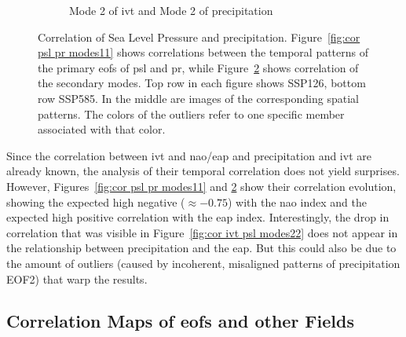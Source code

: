 \begin{figure}[!htbp]
\begin{subfigure}[b]{0.95\textwidth}
    \caption{Mode 2 of \ac{ivt} and Mode 2 of precipitation}
    \label{fig:cor psl pr modes22}
  \end{subfigure}
  \caption[Correlation Boxplots of PSL and PR EOF Modes]{Correlation of Sea Level Pressure and precipitation. Figure~\ref{fig:cor psl pr modes11} shows correlations between the temporal patterns of the primary \acp{eof} of \ac{psl} and \ac{pr}, while Figure~\ref{fig:cor psl pr modes22} shows correlation of the secondary modes. Top row in each figure shows SSP126, bottom row SSP585. In the middle are images of the corresponding spatial patterns. The colors of the outliers refer to one specific member associated with that color.}
\end{figure}

Since the correlation between \ac{ivt} and \ac{nao}/\ac{eap} and precipitation and \ac{ivt} are already known, the analysis of their temporal correlation does not yield surprises. 
However, Figures~\ref{fig:cor psl pr modes11} and \ref{fig:cor psl pr modes22} show their correlation evolution, showing the expected high negative ($\approx -0.75$) with the \ac{nao} index and the expected high positive correlation with the \ac{eap} index. 
Interestingly, the drop in correlation that was visible in Figure~\ref{fig:cor ivt psl modes22} does not appear in the relationship between precipitation and the \ac{eap}. 
But this could also be due to the amount of outliers (caused by incoherent, misaligned patterns of precipitation EOF2) that warp the results. 




\subsection{Correlation Maps of \acp{eof} and other Fields}


